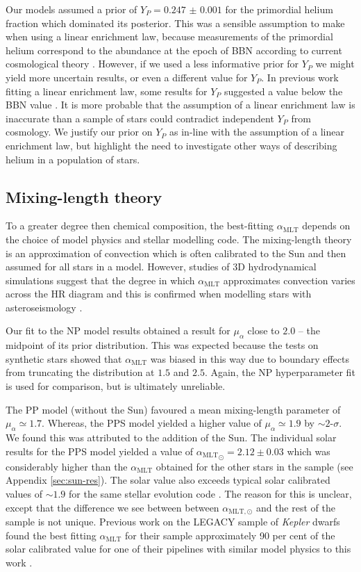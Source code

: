 \documentclass[a4paper,fleqn,usenatbib]{mnras}
\newcommand{\mlt}{\ensuremath{{\alpha_\mathrm{MLT}}}}
\begin{document}
Our models assumed a prior of $Y_P = \num{0.247(1)}$ for the primordial helium fraction which dominated its posterior. This was a sensible assumption to make when using a linear enrichment law, because measurements of the primordial helium correspond to the abundance at the epoch of BBN according to current cosmological theory \citep{Cyburt.Fields.ea2016}. However, if we used a less informative prior for $Y_P$ we might yield more uncertain results, or even a different value for $Y_P$. In previous work fitting a linear enrichment law, some results for $Y_P$ suggested a value below the BBN value \citep{Casagrande.Flynn.ea2007, SilvaAguirre.Lund.ea2017}. It is more probable that the assumption of a linear enrichment law is inaccurate than a sample of stars could contradict independent $Y_P$ from cosmology. We justify our prior on $Y_P$ as in-line with the assumption of a linear enrichment law, but highlight the need to investigate other ways of describing helium in a population of stars.

\subsection{Mixing-length theory}\label{sec:mlt}

To a greater degree then chemical composition, the best-fitting $\mlt$ depends on the choice of model physics and stellar modelling code. The mixing-length theory is an approximation of convection which is often calibrated to the Sun and then assumed for all stars in a model. However, studies of 3D hydrodynamical simulations suggest that the degree in which $\mlt$ approximates convection varies across the HR diagram \citep{Magic.Weiss.ea2015} and this is confirmed when modelling stars with asteroseismology \citep{Tayar.Somers.ea2017}.

Our fit to the NP model results obtained a result for $\mu_\alpha$ close to $2.0$ -- the midpoint of its prior distribution. This was expected because the tests on synthetic stars showed that $\mlt$ was biased in this way due to boundary effects from truncating the distribution at $1.5$ and $2.5$. Again, the NP hyperparameter fit is used for comparison, but is ultimately unreliable.

The PP model (without the Sun) favoured a mean mixing-length parameter of $\mu_\alpha \simeq 1.7$. Whereas, the PPS model yielded a higher value of $\mu_\alpha \simeq 1.9$ by $\sim 2$-$\sigma$. We found this was attributed to the addition of the Sun. The individual solar results for the PPS model yielded a value of $\mlt_\odot = 2.12\pm0.03$ which was considerably higher than the $\mlt$ obtained for the other stars in the sample (see Appendix \ref{sec:sun-res}). The solar value also exceeds typical solar calibrated values of $\sim 1.9$ for the same stellar evolution code \citep{Stancliffe.Fossati.ea2016}. The reason for this is unclear, except that the difference we see between between $\alpha_{\mathrm{MLT},\odot}$ and the rest of the sample is not unique. Previous work on the LEGACY sample of \emph{Kepler} dwarfs found the best fitting $\mlt$ for their sample approximately 90 per cent of the solar calibrated value for one of their pipelines with similar model physics to this work \citep{SilvaAguirre.Lund.ea2017}.
\end{document}
